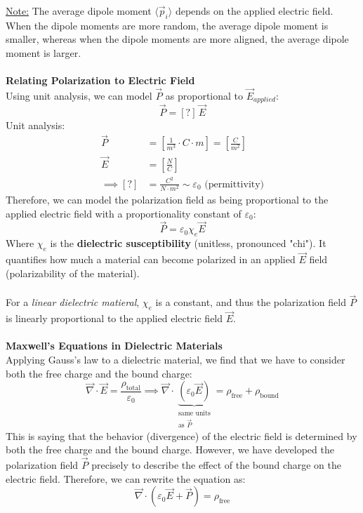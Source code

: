 \documentclass[12pt]{article}
\begin{document}
\underline{Note:} The average dipole moment $\langle \vec{p}_i \rangle$ depends on the applied electric field. When the dipole moments are more random, the average dipole moment is smaller, whereas when the dipole moments are more aligned, the average dipole moment is larger.\\\\
\textbf{Relating Polarization to Electric Field}\\
Using unit analysis, we can model $\vec{P}$ as proportional to $\vec{E}_{applied}$:
\[ \vec{P} = [?]\, \vec{E} \]
Unit analysis:
\[\begin{aligned}
\vec{P} &= \left[ \frac{1}{m^3} \cdot C \cdot m \right] = \left[ \frac{C}{m^2} \right] \\
\vec{E} &= \left[ \frac{N}{C} \right] \\
\implies [?] &= \frac{C^2}{N \cdot m^2} \sim \varepsilon_0 \text{ (permittivity)}
\end{aligned}\]
Therefore, we can model the polarization field as being proportional to the applied electric field with a proportionality constant of $\varepsilon_0$: 
\[\boxed{\vec{P} = \varepsilon_0 \chi_e \vec{E}}\]
Where $\chi_e$ is the \textbf{dielectric susceptibility} (unitless, pronounced "chi"). It quantifies how much a material can become polarized in an applied $\vec{E}$ field (polarizability of the material).\\\\
For a \textit{linear dielectric matieral}, $\chi_e$ is a constant, and thus the polarization field $\vec{P}$ is linearly proportional to the applied electric field $\vec{E}$.\\\\
\textbf{Maxwell's Equations in Dielectric Materials}\\
Applying Gauss's law to a dielectric material, we find that we have to consider both the free charge and the bound charge:
\[\vec{\nabla}\cdot\vec{E} = \frac{\rho_\text{total}}{\varepsilon_0} \implies \vec{{\nabla}}\cdot\underbrace{(\varepsilon_0\vec{E})}_{\substack{\text{same units} \\ \text{as }\vec{P}}} = \rho_\text{free} + \rho_\text{bound}\]
This is saying that the behavior (divergence) of the electric field is determined by both the free charge and the bound charge. However, we have developed the polarization field $\vec{P}$ precisely to describe the effect of the bound charge on the electric field. Therefore, we can rewrite the equation as:
\[\vec{\nabla}\cdot(\varepsilon_0\vec{E} + \vec{P}) = \rho_\text{free}\]
\end{document}
